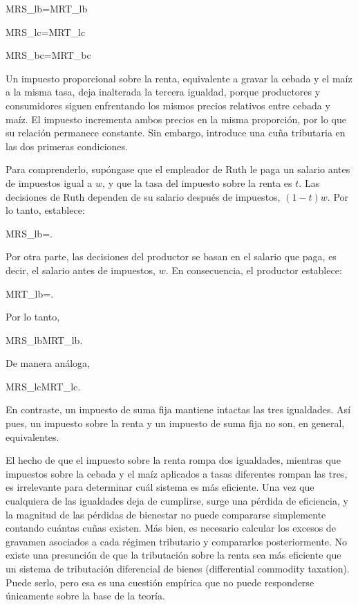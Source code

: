 \documentclass[10pt,a4paper]{article}
\begin{document}
MRS_{lb}=MRT_{lb}

MRS_{lc}=MRT_{lc}

MRS_{bc}=MRT_{bc}

Un impuesto proporcional sobre la renta, equivalente a gravar la cebada y el maíz a la misma tasa, deja inalterada la tercera igualdad, porque productores y consumidores siguen enfrentando los mismos precios relativos entre cebada y maíz. El impuesto incrementa ambos precios en la misma proporción, por lo que su relación permanece constante. Sin embargo, introduce una cuña tributaria en las dos primeras condiciones.

Para comprenderlo, supóngase que el empleador de Ruth le paga un salario antes de impuestos igual a $w$, y que la tasa del impuesto sobre la renta es $t$. Las decisiones de Ruth dependen de su salario después de impuestos, $(1 − t)w$. Por lo tanto, establece:

MRS_{lb}=.

Por otra parte, las decisiones del productor se basan en el salario que paga, es decir, el salario antes de impuestos, $w$. En consecuencia, el productor establece:

MRT_{lb}=.

Por lo tanto,

MRS_{lb}\neq MRT_{lb}.

De manera análoga,

MRS_{lc}\neq MRT_{lc}.

En contraste, un impuesto de suma fija mantiene intactas las tres igualdades. Así pues, un impuesto sobre la renta y un impuesto de suma fija no son, en general, equivalentes.

El hecho de que el impuesto sobre la renta rompa dos igualdades, mientras que impuestos sobre la cebada y el maíz aplicados a tasas diferentes rompan las tres, es irrelevante para determinar cuál sistema es más eficiente. Una vez que cualquiera de las igualdades deja de cumplirse, surge una pérdida de eficiencia, y la magnitud de las pérdidas de bienestar no puede compararse simplemente contando cuántas cuñas existen. Más bien, es necesario calcular los excesos de gravamen asociados a cada régimen tributario y compararlos posteriormente. No existe una presunción de que la tributación sobre la renta sea más eficiente que un sistema de tributación diferencial de bienes (differential commodity taxation). Puede serlo, pero esa es una cuestión empírica que no puede responderse únicamente sobre la base de la teoría.
\end{document}
